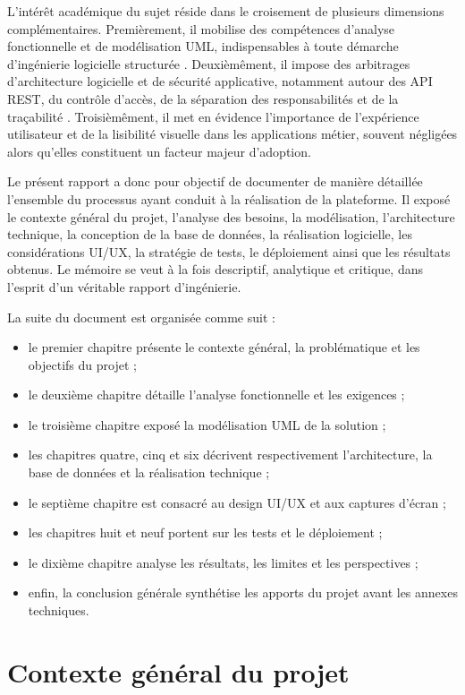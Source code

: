 ﻿\documentclass[12pt,a4paper,oneside]{report}
\begin{document}
L'intérêt académique du sujet réside dans le croisement de plusieurs dimensions complémentaires. Premièrement, il mobilise des compétences d'analyse fonctionnelle et de modélisation UML, indispensables à toute démarche d'ingénierie logicielle structurée \cite{booch2005}. Deuxièmêment, il impose des arbitrages d'architecture logicielle et de sécurité applicative, notamment autour des API REST, du contrôle d'accès, de la séparation des responsabilités et de la traçabilité \cite{fielding2000,owasp2021}. Troisièmêment, il met en évidence l'importance de l'expérience utilisateur et de la lisibilité visuelle dans les applications métier, souvent négligées alors qu'elles constituent un facteur majeur d'adoption.

Le présent rapport a donc pour objectif de documenter de manière détaillée l'ensemble du processus ayant conduit à la réalisation de la plateforme. Il exposé le contexte général du projet, l'analyse des besoins, la modélisation, l'architecture technique, la conception de la base de données, la réalisation logicielle, les considérations UI/UX, la stratégie de tests, le déploiement ainsi que les résultats obtenus. Le mémoire se veut à la fois descriptif, analytique et critique, dans l'esprit d'un véritable rapport d'ingénierie.

La suite du document est organisée comme suit :
\begin{itemize}
  \item le premier chapitre présente le contexte général, la problématique et les objectifs du projet ;
  \item le deuxième chapitre détaille l'analyse fonctionnelle et les exigences ;
  \item le troisième chapitre exposé la modélisation UML de la solution ;
  \item les chapitres quatre, cinq et six décrivent respectivement l'architecture, la base de données et la réalisation technique ;
  \item le septième chapitre est consacré au design UI/UX et aux captures d'écran ;
  \item les chapitres huit et neuf portent sur les tests et le déploiement ;
  \item le dixième chapitre analyse les résultats, les limites et les perspectives ;
  \item enfin, la conclusion générale synthétise les apports du projet avant les annexes techniques.
\end{itemize}

\chapter{Contexte général du projet}
\label{chap:contexte}
\end{document}
